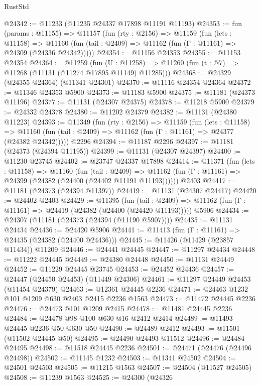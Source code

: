 \begin{lexlean}{RustStd}
\begin{coremodule}
@24342 := @11233 (@11235 @24337 @17898 @11191 @11193)
@24353 := fun (params : @11155) =>
  @11157
    (fun (rty : @2156) =>
    @11159
      (fun (lets : @11158) =>
      @11160 (fun (tail : @2409) => @11162 (fun (Γ : @11161) => @24309 (@24336 @24342)))))
@24354 := @11156 @24353
@24355 := @11153 @24354
@24364 := @11259
    (fun (U : @11258) => @11260 (fun (t : @7) => @11268 (@11131 (@11274 @17895 @11149) @11285)))
@24368 := @24329 (@24355 @24364) (@11341 @24301)
@24370 := @11116 @24354 @24364
@24372 := @11346 @24353 @5900
@24373 := @11183 @5900
@24375 := @11181 (@24373 @11196)
@24377 := @11131 (@24307 @24375)
@24378 := @11218 @5900
@24379 := @24332 @24378
@24380 := @11202 @24379
@24382 := @11131 (@24380 @11223)
@24393 := @11349
    (fun (rty : @2156) =>
    @11159
      (fun (lets : @11158) =>
      @11160 (fun (tail : @2409) => @11162 (fun (Γ : @11161) => @24377 (@24382 @24342)))))
    @2296
@24394 := @11187 @2296
@24397 := @11181 (@24373 (@24394 @11195))
@24399 := @11131 (@24307 @24397)
@24400 := @11230 @23745
@24402 := @23747 @24337 @17898
@24414 := @11371
    (fun (lets : @11158) =>
    @11160
      (fun (tail : @2409) =>
      @11162 (fun (Γ : @11161) => @24399 (@24382 (@24400 (@24402 @11191 @11193))))))
    @2403
@24417 := @11181 (@24373 (@24394 @11397))
@24419 := @11131 (@24307 @24417)
@24420 := @24402 @2403
@24429 := @11395
    (fun (tail : @2409) => @11162 (fun (Γ : @11161) => @24419 (@24382 (@24400 (@24420 @11193)))))
    @5906
@24434 := @24307 (@11181 (@24373 (@24394 (@11190 @5907))))
@24435 := @11131 @24434
@24436 := @24420 @5906
@24441 := @11413 (fun (Γ : @11161) => @24435 (@24382 (@24400 @24436)))
@24445 := @11426 (@11429 (@23857 @11434)) @11209
@24446 := @24441 @24445
@24447 := @11297 @24434
@24448 := @11222 @24445
@24449 := @24380 @24448
@24450 := @11131 @24449
@24452 := @11229 @24445 @23745
@24453 := @24452 @24436
@24457 := @24447 (@24450 @24453) (@11449 @24306)
@24461 := @11297 @24449 @24453 (@11454 @24379)
@24463 := @12361 @24445 @2236
@24471 := @24463 @1232 @101 @1209 @630 @2403 @2415 @2236 @1563
@24473 := @11472 @24445 @2236
@24476 := @24473 @101 @1209 @2415
@24478 := @11481 @24445 @2236
@24484 := @24478 @98 @100 @630 @16 @2412 @2414
@24489 := @11493 @24445 @2236 @50 @630 @50
@24490 := @24489 @2412
@24493 := @11501 (@11502 @24445 @50)
@24495 := @24490 @24493 @11512
@24496 := @24484 @24495
@24498 := @11518 @24445 @2236
@24501 := @24471 (@24476 (@24496 @24498))
@24502 := @11145 @1232
@24503 := @11341 @24502
@24504 := @24501 @24503
@24505 := @11215 @1563
@24507 := @24504 (@11527 @24505)
@24508 := @11239 @1563
@24525 := @24300
    (@24326

\end{coremodule}
\end{lexlean}
